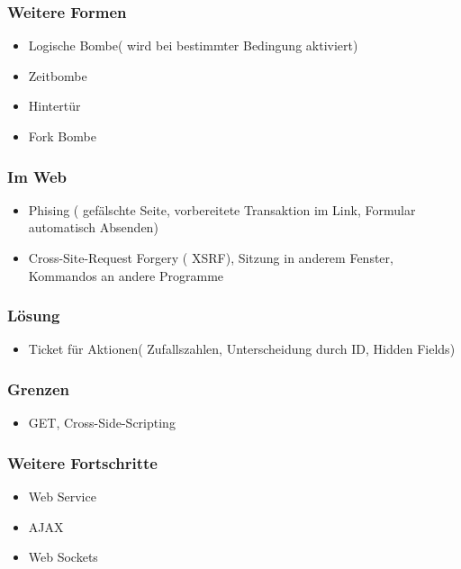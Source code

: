\subsubsection*{ Weitere Formen }
\begin{itemize}
	\item Logische Bombe( wird bei bestimmter Bedingung aktiviert)
	\item Zeitbombe
	\item Hintertür 
	\item Fork Bombe
\end{itemize}

\subsubsection*{ Im Web }
\begin{itemize}
	\item Phising ( gefälschte Seite, vorbereitete Transaktion im Link, Formular automatisch Absenden)
	\item Cross-Site-Request Forgery ( XSRF), Sitzung in anderem Fenster, Kommandos an andere Programme
\end{itemize}

\subsubsection*{ Lösung }
\begin{itemize}
	\item Ticket für Aktionen( Zufallszahlen, Unterscheidung durch ID, Hidden Fields)
\end{itemize}

\subsubsection*{ Grenzen }
\begin{itemize}
	\item GET, Cross-Side-Scripting
\end{itemize}

\subsubsection*{ Weitere Fortschritte }
\begin{itemize}
	\item Web Service
	\item AJAX
	\item Web Sockets
\end{itemize}


